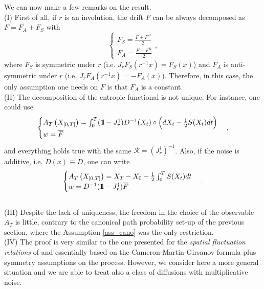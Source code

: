 \documentclass[a4paper,11pt]{article}
\numberwithin{equation}{section}
\newcommand{\bbbone}{\mathchoice {\rm 1\mskip-4mu l} {\rm 1\mskip-4mu l}
{\rm 1\mskip-4.5mu l} {\rm 1\mskip-5mu l}}
\begin{document}
We can now make a few remarks on the result. \\
(I) First of all, if $r$ is an involution, the drift $F$ can be always decomposed as $F=F_A + F_S$ with
\begin{equation}
    \begin{cases}
     F_{S}=\frac{F+ F^R}{2}\\
     F_{A}=\frac{F- F^R}{2}
    \end{cases},
\end{equation}
where $F_{S}$ is symmetric under $r$ (i.e. $ J_r F_{S}(r^{-1}x)=F_{S}(x)$)
and $F_{A}$ is anti-symmetric under $r$ (i.e. $J_r F_{A}(r^{-1}x)=-F_{A}(x)$). Therefore, in this case, the only assumption one needs on $F$ is that $F_A$ is a constant. \\
(II) The decomposition of the entropic functional is not unique. For instance, one could use
$$\begin{cases}
     A_T\left(X_{\left[0,T\right]}\right)=\int_{0}^{T} (\bbbone -J_r^\dag) D^{-1}(X_{t})\circ \Big(dX_{t} - \frac{1}{2} S(X_t) dt \Big) \\
     w=  \overline{F} 
\end{cases},$$ 
and everything holds true with the same $\mathcal{R}= (J_r^\dag)^{-1} $. Also, if the noise is additive, i.e. $D(x)\equiv D$, one can write
$$\begin{cases}
     A_T\left(X_{\left[0,T\right]}\right)= X_T -X_0 - \frac{1}{2}\int_{0}^{T} S(X_t) dt  \\
     w= D^{-1} (\bbbone -J_r^\dag) \overline{F} 
\end{cases}.$$
\\ 
(III) Despite the lack of uniqueness, the freedom in the choice of the observable $A_T$ is little, contrary to the canonical path probability set-up of the previous section, where the Assumption \ref{ass_cano} was the only restriction.  
\\
(IV) The proof is very similar to the one presented for the \emph{spatial fluctuation relations} of \cite{PRG15} and essentially based on the Cameron-Martin-Girsanov formula plus symmetry assumptions on the process. However, we consider here a more general situation and we are able to treat also a class of diffusions with multiplicative noise.
\end{document}

